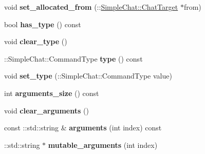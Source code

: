 \begin{DoxyCompactItemize}
\item 
\hypertarget{classSimpleChat_1_1ChatCommand_ac1d0a0670c25e0bd45fb4fb1b3681778}{void {\bfseries set\-\_\-allocated\-\_\-from} (\-::\hyperlink{classSimpleChat_1_1ChatTarget}{Simple\-Chat\-::\-Chat\-Target} $\ast$from)}\label{classSimpleChat_1_1ChatCommand_ac1d0a0670c25e0bd45fb4fb1b3681778}

\item 
\hypertarget{classSimpleChat_1_1ChatCommand_ac025a3bd4ab17df6a987556a62d21d32}{bool {\bfseries has\-\_\-type} () const }\label{classSimpleChat_1_1ChatCommand_ac025a3bd4ab17df6a987556a62d21d32}

\item 
\hypertarget{classSimpleChat_1_1ChatCommand_ae22b2fee3b56c197da6ccaebb65cc461}{void {\bfseries clear\-\_\-type} ()}\label{classSimpleChat_1_1ChatCommand_ae22b2fee3b56c197da6ccaebb65cc461}

\item 
\hypertarget{classSimpleChat_1_1ChatCommand_ab9a37b304ef541475407cccb7b5595d3}{\-::Simple\-Chat\-::\-Command\-Type {\bfseries type} () const }\label{classSimpleChat_1_1ChatCommand_ab9a37b304ef541475407cccb7b5595d3}

\item 
\hypertarget{classSimpleChat_1_1ChatCommand_aa6edfc9ce7ca03bdb4d6708012287d3e}{void {\bfseries set\-\_\-type} (\-::Simple\-Chat\-::\-Command\-Type value)}\label{classSimpleChat_1_1ChatCommand_aa6edfc9ce7ca03bdb4d6708012287d3e}

\item 
\hypertarget{classSimpleChat_1_1ChatCommand_a95b2f8f664a9190c1688437015ede8ea}{int {\bfseries arguments\-\_\-size} () const }\label{classSimpleChat_1_1ChatCommand_a95b2f8f664a9190c1688437015ede8ea}

\item 
\hypertarget{classSimpleChat_1_1ChatCommand_a68ced4138bb856398cd6c9e47be087aa}{void {\bfseries clear\-\_\-arguments} ()}\label{classSimpleChat_1_1ChatCommand_a68ced4138bb856398cd6c9e47be087aa}

\item 
\hypertarget{classSimpleChat_1_1ChatCommand_a8ecf60b1a7540f478519642e518546a7}{const \-::std\-::string \& {\bfseries arguments} (int index) const }\label{classSimpleChat_1_1ChatCommand_a8ecf60b1a7540f478519642e518546a7}

\item 
\hypertarget{classSimpleChat_1_1ChatCommand_a3f6a95b2a82d1fc2d9915898ed06b18e}{\-::std\-::string $\ast$ {\bfseries mutable\-\_\-arguments} (int index)}\label{classSimpleChat_1_1ChatCommand_a3f6a95b2a82d1fc2d9915898ed06b18e}


\end{DoxyCompactItemize}
